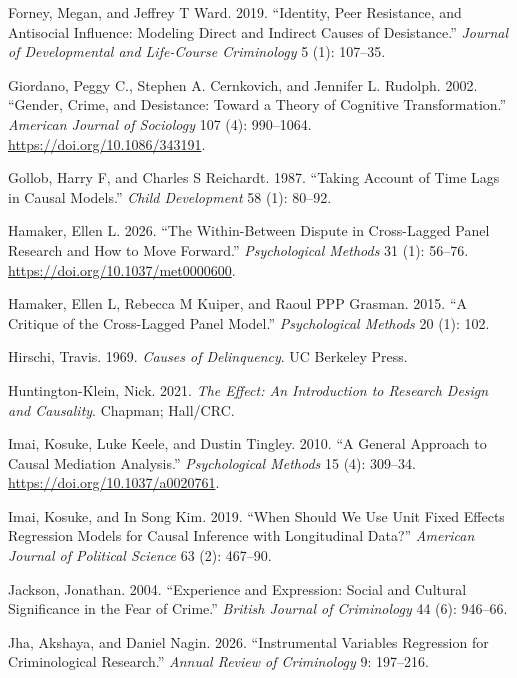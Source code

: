 \documentclass[
  letterpaper,
  DIV=11,
  numbers=noendperiod]{scrartcl}
\newlength{\cslhangindent}
\newenvironment{CSLReferences}[2] %
 {\begin{list}{}{%
  \setlength{\itemindent}{0pt}
  \setlength{\leftmargin}{0pt}
  \setlength{\parsep}{0pt}
  \ifodd #1
   \setlength{\leftmargin}{\cslhangindent}
   \setlength{\itemindent}{-1\cslhangindent}
  \fi
  \setlength{\itemsep}{#2\baselineskip}}}
 {\end{list}}
\begin{document}
\begin{CSLReferences}{1}{0}
Forney, Megan, and Jeffrey T Ward. 2019. {``Identity, Peer Resistance,
and Antisocial Influence: Modeling Direct and Indirect Causes of
Desistance.''} \emph{Journal of Developmental and Life-Course
Criminology} 5 (1): 107--35.

Giordano, Peggy C., Stephen A. Cernkovich, and Jennifer L. Rudolph.
2002. {``Gender, Crime, and Desistance: Toward a Theory of Cognitive
Transformation.''} \emph{American Journal of Sociology} 107 (4):
990--1064. \url{https://doi.org/10.1086/343191}.

Gollob, Harry F, and Charles S Reichardt. 1987. {``Taking Account of
Time Lags in Causal Models.''} \emph{Child Development} 58 (1): 80--92.

Hamaker, Ellen L. 2026. {``The Within-Between Dispute in Cross-Lagged
Panel Research and How to Move Forward.''} \emph{Psychological Methods}
31 (1): 56--76. \url{https://doi.org/10.1037/met0000600}.

Hamaker, Ellen L, Rebecca M Kuiper, and Raoul PPP Grasman. 2015. {``A
Critique of the Cross-Lagged Panel Model.''} \emph{Psychological
Methods} 20 (1): 102.

Hirschi, Travis. 1969. \emph{Causes of Delinquency}. UC Berkeley Press.

Huntington-Klein, Nick. 2021. \emph{The Effect: An Introduction to
Research Design and Causality}. Chapman; Hall/CRC.

Imai, Kosuke, Luke Keele, and Dustin Tingley. 2010. {``A General
Approach to Causal Mediation Analysis.''} \emph{Psychological Methods}
15 (4): 309--34. \url{https://doi.org/10.1037/a0020761}.

Imai, Kosuke, and In Song Kim. 2019. {``When Should We Use Unit Fixed
Effects Regression Models for Causal Inference with Longitudinal
Data?''} \emph{American Journal of Political Science} 63 (2): 467--90.

Jackson, Jonathan. 2004. {``Experience and Expression: Social and
Cultural Significance in the Fear of Crime.''} \emph{British Journal of
Criminology} 44 (6): 946--66.

Jha, Akshaya, and Daniel Nagin. 2026. {``Instrumental Variables
Regression for Criminological Research.''} \emph{Annual Review of
Criminology} 9: 197--216.


\end{CSLReferences}
\end{document}
